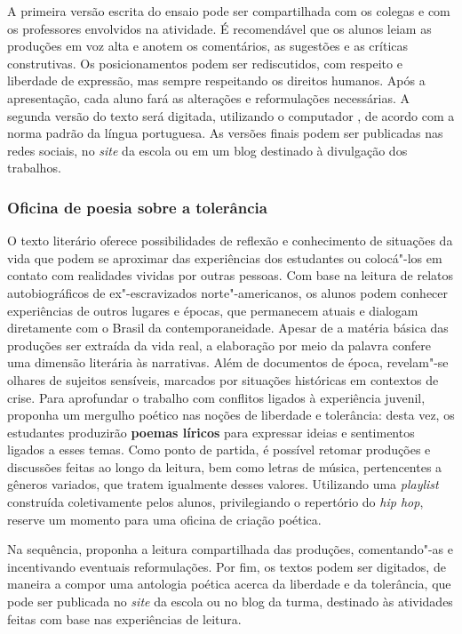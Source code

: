 \documentclass[11pt]{extarticle}
\begin{document}
A primeira versão escrita do ensaio pode ser compartilhada com os
colegas e com os professores envolvidos na atividade. É recomendável que
os alunos leiam as produções em voz alta e anotem os comentários, as
sugestões e as críticas construtivas. Os posicionamentos podem ser
rediscutidos, com respeito e liberdade de expressão, mas sempre
respeitando os direitos humanos. Após a apresentação, cada aluno fará as
alterações e reformulações necessárias. A segunda versão do texto será
digitada, utilizando o computador , de acordo com a norma padrão da
língua portuguesa. As versões finais podem ser publicadas nas redes
sociais, no \emph{site} da escola ou em um blog destinado à divulgação
dos trabalhos.

\subsubsection{Oficina de poesia sobre a tolerância}


O texto literário oferece possibilidades de reflexão e conhecimento de
situações da vida que podem se aproximar das experiências dos
estudantes ou colocá"-los em contato com realidades vividas por outras
pessoas. Com base na leitura de relatos autobiográficos de
ex"-escravizados norte"-americanos, os alunos podem conhecer
experiências de outros lugares e épocas, que permanecem atuais e
dialogam diretamente com o Brasil da contemporaneidade. Apesar de a
matéria básica das produções ser extraída da vida real, a elaboração
por meio da palavra confere uma dimensão literária às narrativas. Além
de documentos de época, revelam"-se olhares de sujeitos sensíveis,
marcados por situações históricas em contextos de crise. Para
aprofundar o trabalho com conflitos ligados à experiência juvenil,
proponha um mergulho poético nas noções de liberdade e tolerância:
desta vez, os estudantes produzirão \textbf{poemas líricos} para
expressar ideias e sentimentos ligados a esses temas. Como ponto de
partida, é possível retomar produções e discussões feitas ao longo da
leitura, bem como letras de música, pertencentes a gêneros variados,
que tratem igualmente desses valores. Utilizando uma \emph{playlist}
construída coletivamente pelos alunos, privilegiando o repertório do
\emph{hip hop}, reserve um momento para uma oficina de criação
poética. 


Na sequência, proponha a leitura compartilhada das produções,
comentando"-as e incentivando eventuais reformulações. Por fim, os
textos podem ser digitados, de maneira a compor uma antologia poética
acerca da liberdade e da tolerância, que pode ser publicada no
\emph{site} da escola ou no blog da turma, destinado às atividades
feitas com base nas experiências de leitura.
\end{document}
